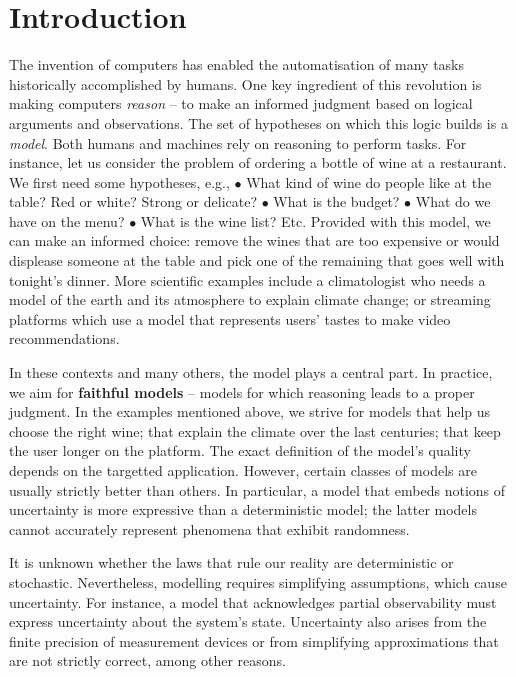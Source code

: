 
\section{Introduction}
The invention of computers has enabled the automatisation of many tasks historically accomplished by humans. One key ingredient of this revolution is making computers \textit{reason} -- to make an informed judgment based on logical arguments and observations. The set of hypotheses on which this logic builds is a \textit{model}. Both humans and machines rely on reasoning to perform tasks. For instance, let us consider the problem of ordering a bottle of wine at a restaurant. We first need some hypotheses, e.g., $\bullet$ What kind of wine do people like at the table? Red or white? Strong or delicate? $\bullet$ What is the budget? $\bullet$ What do we have on the menu? $\bullet$ What is the wine list? Etc. Provided with this model, we can make an informed choice: remove the wines that are too expensive or would displease someone at the table and pick one of the remaining that goes well with tonight's dinner. More scientific examples include a climatologist who needs a model of the earth and its atmosphere to explain climate change; or streaming platforms which use a model that represents users' tastes to make video recommendations.

In these contexts and many others, the model plays a central part. In practice, we aim for \textbf{faithful models} -- models for which reasoning leads to a proper judgment. In the examples mentioned above, we strive for models that help us choose the right wine; that explain the climate over the last centuries; that keep the user longer on the platform. The exact definition of the model's quality depends on the targetted application. However, certain classes of models are usually strictly better than others.
In particular, a model that embeds notions of uncertainty is more expressive than a deterministic model; the latter models cannot accurately represent phenomena that exhibit randomness.

It is unknown whether the laws that rule our reality are deterministic or stochastic. Nevertheless, modelling requires simplifying assumptions, which cause uncertainty. For instance, a model that acknowledges partial observability must express uncertainty about the system's state. Uncertainty also arises from the finite precision of measurement devices or from simplifying approximations that are not strictly correct, among other reasons.

